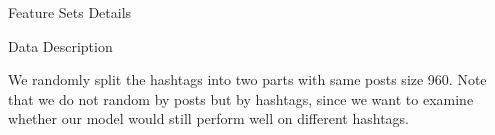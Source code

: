 \documentclass[final,hyperref={pdfpagelabels=false}]{beamer}
\begin{document}
\begin{frame}[t]
\begin{columns}[t]
\begin{column}{.465\textwidth}
\begin{block}{Feature Sets Details}
\end{block}




\begin{block}{Data Description}

We randomly split the hashtags into two parts with same posts size 960. Note that we do not random by posts but by hashtags, since we want to examine whether our model would still perform well on different hashtags.

\begin{table}[h]
\centering


\end{table}
\end{block}
\end{column}
\end{columns}
\end{frame}
\end{document}
